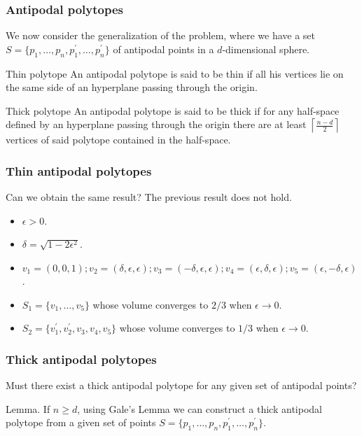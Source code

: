 \documentclass{beamer}
\begin{document}
\begin{frame}
\frametitle{Antipodal polytopes}
We now consider the generalization of the problem, where we have a set $S = \{p_{1},\dots,p_{n},p_{1}^{\prime},\dots,p_{n}^{\prime}\}$ of antipodal points in a $d$-dimensional sphere.\pause
\begin{block}{Thin polytope}
An antipodal polytope is said to be thin if all his vertices lie on the same side of an hyperplane passing through the origin.
\end{block}\pause
\begin{block}{Thick polytope}
An antipodal polytope is said to be thick if for any half-space defined by an hyperplane passing through the origin there are at least $\left \lceil{\frac{n-d}{2}}\right \rceil $ vertices of said polytope contained in the half-space.
\end{block}
\end{frame}

\begin{frame}
\frametitle{Thin antipodal polytopes}
\begin{alertblock}{Can we obtain the same result?}
The previous result does not hold.
\end{alertblock}\pause
\begin{example}
\begin{itemize}
\item<2-> $\epsilon>0$.
\item<3-> $\delta = \sqrt{1-2\epsilon^{2}}$.
\item<4-> $v_{1} = (0,0,1);v_{2}= (\delta,\epsilon,\epsilon);v_{3}= (-\delta,\epsilon,\epsilon);v_{4}= (\epsilon,\delta,\epsilon);v_{5}= (\epsilon,-\delta,\epsilon)$.
\item<5-> $S_{1} = \{v_{1},\dots,v_{5}\}$ whose volume converges to $2/3$ when $\epsilon\to 0$.
\item<6-> $S_{2} = \{v_{1}^{\prime},v_{2}^{\prime},v_{3},v_{4},v_{5}\}$ whose volume converges to $1/3$ when $\epsilon\to 0$.
\end{itemize}
\end{example}
\end{frame}

\begin{frame}
\begin{figure}
\end{figure}
\end{frame}

\begin{frame}
\frametitle{Thick antipodal polytopes}
Must there exist a thick antipodal polytope for any given set of antipodal points?
\begin{alertblock}{Lemma.}
If $n\geq d$, using Gale's Lemma we can construct a thick antipodal polytope from a given set of points $S= \{p_{1},\dots,p_{n},p_{1}^{\prime},\dots,p_{n}^{\prime}\}$.
\end{alertblock}

\end{frame}
\end{document}
